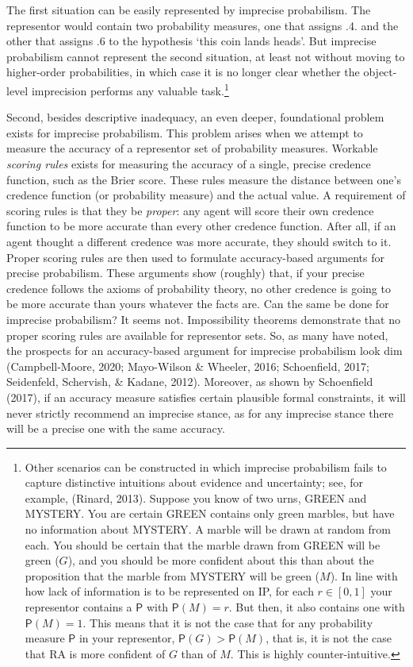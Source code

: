 \documentclass[
  10pt,
  dvipsnames,enabledeprecatedfontcommands]{scrartcl}
\newcommand{\pr}[1]{\mathsf{P}(#1)}
\begin{document}
\noindent The first situation can be easily represented by imprecise
probabilism. The representor would contain two probability measures, one
that assigns .4. and the other that assigns .6 to the hypothesis `this
coin lands heads'. But imprecise probabilism cannot represent the second
situation, at least not without moving to higher-order probabilities, in
which case it is no longer clear whether the object-level imprecision
performs any valuable task.\footnote{Other scenarios can be constructed
  in which imprecise probabilism fails to capture distinctive intuitions
  about evidence and uncertainty; see, for example, (Rinard, 2013).
  Suppose you know of two urns, \textsf{GREEN} and \textsf{MYSTERY}. You
  are certain \textsf{GREEN} contains only green marbles, but have no
  information about \textsf{MYSTERY}. A marble will be drawn at random
  from each. You should be certain that the marble drawn from
  \textsf{GREEN} will be green (\(G\)), and you should be more confident
  about this than about the proposition that the marble from
  \textsf{MYSTERY} will be green (\(M\)). In line with how lack of
  information is to be represented on \textsf{IP}, for each
  \(r\in [0,1]\) your representor contains a \(\mathsf{P}\) with
  \(\pr{M}=r\). But then, it also contains one with \(\pr{M}=1\). This
  means that it is not the case that for any probability measure
  \(\mathsf{P}\) in your representor, \(\mathsf{P}(G) > \mathsf{P}(M)\),
  that is, it is not the case that RA is more confident of \(G\) than of
  \(M\). This is highly counter-intuitive.}

Second, besides descriptive inadequacy, an even deeper, foundational
problem exists for imprecise probabilism. This problem arises when we
attempt to measure the accuracy of a representor set of probability
measures. Workable \emph{scoring rules} exists for measuring the
accuracy of a single, precise credence function, such as the Brier
score. These rules measure the distance between one's credence function
(or probability measure) and the actual value. A requirement of scoring
rules is that they be \emph{proper}: any agent will score their own
credence function to be more accurate than every other credence
function. After all, if an agent thought a different credence was more
accurate, they should switch to it. Proper scoring rules are then used
to formulate accuracy-based arguments for precise probabilism. These
arguments show (roughly) that, if your precise credence follows the
axioms of probability theory, no other credence is going to be more
accurate than yours whatever the facts are. Can the same be done for
imprecise probabilism? It seems not. Impossibility theorems demonstrate
that no proper scoring rules are available for representor sets. So, as
many have noted, the prospects for an accuracy-based argument for
imprecise probabilism look dim (Campbell-Moore, 2020; Mayo-Wilson \&
Wheeler, 2016; Schoenfield, 2017; Seidenfeld, Schervish, \& Kadane,
2012). Moreover, as shown by Schoenfield (2017), if an accuracy measure
satisfies certain plausible formal constraints, it will never strictly
recommend an imprecise stance, as for any imprecise stance there will be
a precise one with the same accuracy.
\end{document}
